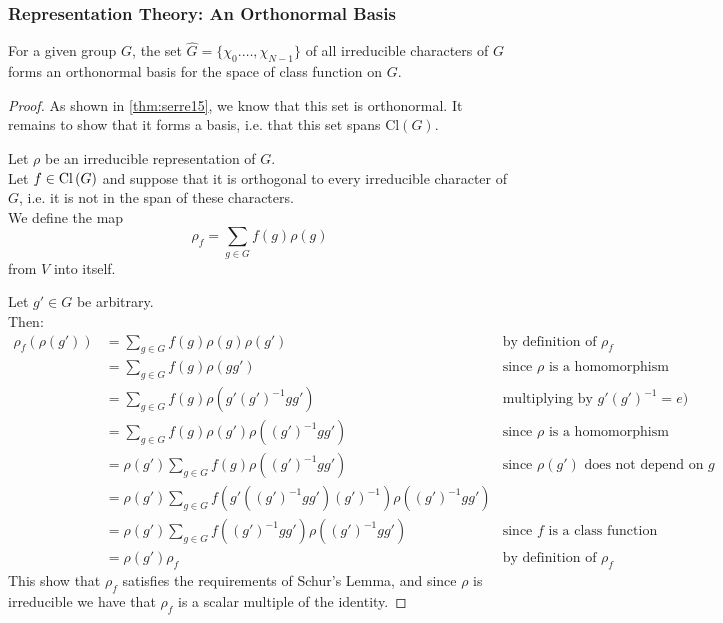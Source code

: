\documentclass{beamer}
\newcommand{\Cl}[1]{\textnormal{Cl}\left(#1\right)}
\begin{document}
\begin{frame}
\frametitle{Representation Theory: An Orthonormal Basis}
        \begin{theorem}\label{thm:irr_characters}
            For a given group $G$, the set $\hat{G} = \{\chi_0. \dots, \chi_{N-1}\}$ of all irreducible characters of $G$ forms an orthonormal basis for the space of class function on $G$.
        \end{theorem}
        \begin{proof}
            As shown in \ref{thm:serre15}, we know that this set is orthonormal. It remains to show that it forms a basis, i.e. that this set spans $\text{Cl}(G)$.

            Let $\rho$ be an irreducible representation of $G$.\\
            Let $f \in \Cl{G}$ and suppose that it is orthogonal to every irreducible character of $G$, i.e. it is not in the span of these characters.\\
            We define the map 
                $$\rho_f = \sum_{g \in G} f(g) \rho(g)$$
            from $V$ into itself.

            Let $g' \in G$ be arbitrary.\\
            Then:
            \begin{align*}
            \rho_f(\rho(g')) &= \sum_{g \in G} f(g) \rho(g) \rho(g') & \text{by definition of $\rho_f$}\\
            &= \sum_{g \in G} f(g) \rho(gg') & \text{since $\rho$ is a homomorphism}\\
            &= \sum_{g \in G} f(g) \rho(g'(g')^{-1} g g') & \text{multiplying by $g'(g')^{-1} = e)$}\\
            &= \sum_{g \in G} f(g) \rho(g') \rho((g')^{-1} g g') & \text{since $\rho$ is a homomorphism}\\
            &= \rho(g') \sum_{g \in G} f(g) \rho((g')^{-1} g g') & \text{since $\rho(g')$ does not depend on $g$}\\
            &= \rho(g') \sum_{g \in G} f(g' ((g')^{-1} g g') (g')^{-1}) \rho((g')^{-1} g g')\\
            &= \rho(g') \sum_{g \in G} f((g')^{-1} g g') \rho((g')^{-1} g g') & \text{since $f$ is a class function}\\
            &= \rho(g') \rho_f & \text{by definition of $\rho_f$}
            \end{align*}
            This show that $\rho_f$ satisfies the requirements of Schur's Lemma, and since $\rho$ is irreducible we have that $\rho_f$ is a scalar multiple of the identity.


\end{proof}
\end{frame}
\end{document}
